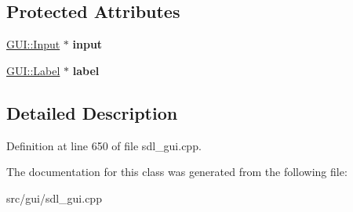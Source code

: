 \subsection*{Protected Attributes}
\begin{DoxyCompactItemize}
\item 
\hypertarget{classPropertyEditorInt_a9723b1ce18a08a85bbef9edec6b9fa06}{\hyperlink{classGUI_1_1Input}{G\-U\-I\-::\-Input} $\ast$ {\bfseries input}}\label{classPropertyEditorInt_a9723b1ce18a08a85bbef9edec6b9fa06}

\item 
\hypertarget{classPropertyEditorInt_a992310c7533fc1e121ed81c35c2817c1}{\hyperlink{classGUI_1_1Label}{G\-U\-I\-::\-Label} $\ast$ {\bfseries label}}\label{classPropertyEditorInt_a992310c7533fc1e121ed81c35c2817c1}

\end{DoxyCompactItemize}


\subsection{Detailed Description}


Definition at line 650 of file sdl\-\_\-gui.\-cpp.



The documentation for this class was generated from the following file\-:\begin{DoxyCompactItemize}
\item 
src/gui/sdl\-\_\-gui.\-cpp\end{DoxyCompactItemize}
